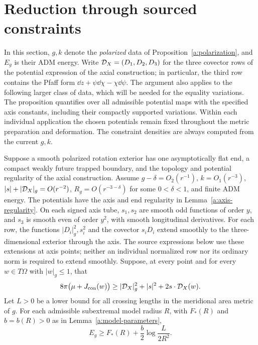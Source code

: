 \section{Reduction through sourced constraints}\label{d:reduction}

In this section, $g,k$ denote the \emph{polarized} data of
Proposition~\ref{a:polarization}, and $E_g$ is their ADM energy.  Write
$\mathcal D_X=(D_1,D_2,D_3)$ for the three covector rows of the potential
expression of the axial construction; in particular, the
third row contains the Pfaff form $\dd z+\psi\dd\chi-\chi\dd\psi$.
The argument also applies to the following larger class of data, which
will be needed for the equality variations.  The proposition
quantifies over all admissible potential maps with the specified
axis constants, including their compactly supported variations.
Within each individual application the chosen potentials remain
fixed throughout the metric preparation and deformation.  The
constraint densities are always computed from the current $g,k$.

\begin{proposition}\label{d:generalized}
Suppose a smooth polarized rotation exterior has one asymptotically
flat end, a compact weakly future trapped boundary, and the topology
and potential regularity of the axial construction.  Assume
$g-\delta=O_2(r^{-1})$, $k=O_1(r^{-3})$,
$|s|+|\mathcal D_X|_g=O(r^{-2})$, $R_g=O(r^{-3-\delta})$ for some
$0<\delta<1$, and finite ADM energy.  The potentials have the axis
and end regularity in Lemma~\ref{a:axis-regularity}.  On each signed
axis tube, $s_1,s_2$ are smooth odd functions of order $y$, and $s_3$
is smooth even of order $y^2$, with smooth longitudinal derivatives.
For each row, the functions $|D_i|_g^2,s_i^2$ and the covector $s_iD_i$
extend smoothly to the three-dimensional exterior through the axis.
The source expressions below use these extensions at axis points;
neither an individual normalized row nor its ordinary norm is
required to extend smoothly.  Suppose, at every point and for every
$w\in T\Omega$ with $|w|_g\le1$, that
\begin{equation}\label{d:sourced}
 8\pi\bigl(\mu+J_{\rm con}(w)\bigr)
 \ge |\mathcal D_X|_g^2+|s|^2+2s\cdot\mathcal D_X(w).
\end{equation}
Let $L>0$ be a lower bound for all crossing lengths in the meridional
area metric of $g$.  For each admissible subextremal model radius $R$,
with $F_*(R)$ and $b=b(R)>0$ as in Lemma~\ref{a:model-parameters},
\begin{equation}\label{d:sourced-comparison}
 E_g\ge F_*(R)+\frac b2\log\frac{L}{2R^2}.
\end{equation}
\end{proposition}

